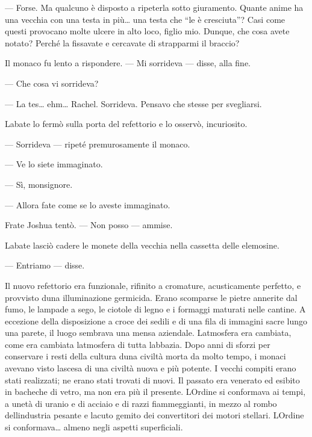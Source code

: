 --- Forse. Ma qualcuno è disposto a ripeterla sotto giuramento. Quante
anime ha una vecchia con una testa in più\ldots{} una testa che ``le è
cresciuta''? Casi come questi provocano molte ulcere in alto loco,
figlio mio. Dunque, che cosa avete notato? Perché la fissavate e
cercavate di strapparmi il braccio?

Il monaco fu lento a rispondere. --- Mi sorrideva --- disse, alla fine.

--- Che cosa vi sorrideva?

--- La tes\ldots{} ehm\ldots{} Rachel. Sorrideva. Pensavo che stesse per
svegliarsi.

L\textquotesingle abate lo fermò sulla porta del refettorio e lo
osservò, incuriosito.

--- Sorrideva --- ripeté premurosamente il monaco.

--- Ve lo siete immaginato.

--- Sì, monsignore.

--- Allora fate come se lo aveste immaginato.

Frate Joshua tentò. --- Non posso --- ammise.

L\textquotesingle abate lasciò cadere le monete della vecchia nella
cassetta delle elemosine.

--- Entriamo --- disse.

Il nuovo refettorio era funzionale, rifinito a cromature, acusticamente
perfetto, e provvisto d\textquotesingle una illuminazione germicida.
Erano scomparse le pietre annerite dal fumo, le lampade a sego, le
ciotole di legno e i formaggi maturati nelle cantine. A eccezione della
disposizione a croce dei sedili e di una fila di immagini sacre lungo
una parete, il luogo sembrava una mensa aziendale.
L\textquotesingle atmosfera era cambiata, come era cambiata
l\textquotesingle atmosfera di tutta l\textquotesingle abbazia. Dopo
anni di sforzi per conservare i resti della cultura
d\textquotesingle una civiltà morta da molto tempo, i monaci avevano
visto l\textquotesingle ascesa di una civiltà nuova e più potente. I
vecchi compiti erano stati realizzati; ne erano stati trovati di nuovi.
Il passato era venerato ed esibito in bacheche di vetro, ma non era più
il presente. L\textquotesingle Ordine si conformava ai tempi, a
un\textquotesingle età di uranio e di acciaio e di razzi fiammeggianti,
in mezzo al rombo dell\textquotesingle industria pesante e
l\textquotesingle acuto gemito dei convertitori dei motori stellari.
L\textquotesingle Ordine si conformava\ldots{} almeno negli aspetti
superficiali.

